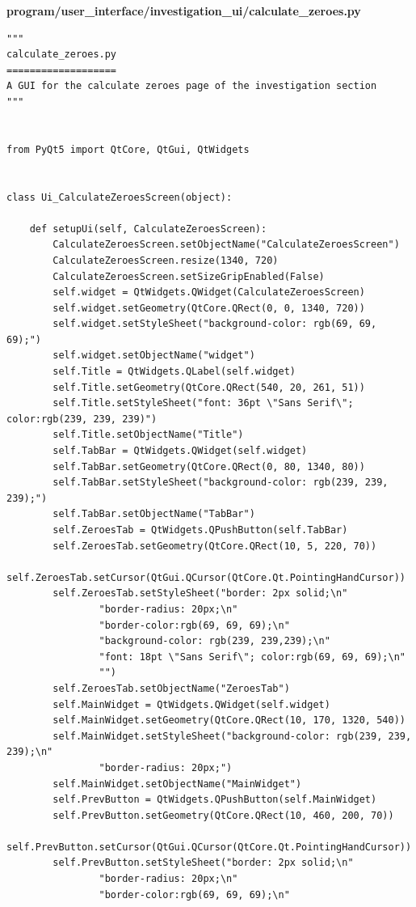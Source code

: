 \documentclass{article}
\begin{document}
\textbf{program/user\_interface/investigation\_ui/calculate\_zeroes.py}
\begin{lstlisting}
"""
calculate_zeroes.py
===================
A GUI for the calculate zeroes page of the investigation section
"""


from PyQt5 import QtCore, QtGui, QtWidgets


class Ui_CalculateZeroesScreen(object):

    def setupUi(self, CalculateZeroesScreen):
        CalculateZeroesScreen.setObjectName("CalculateZeroesScreen")
        CalculateZeroesScreen.resize(1340, 720)
        CalculateZeroesScreen.setSizeGripEnabled(False)
        self.widget = QtWidgets.QWidget(CalculateZeroesScreen)
        self.widget.setGeometry(QtCore.QRect(0, 0, 1340, 720))
        self.widget.setStyleSheet("background-color: rgb(69, 69, 69);")
        self.widget.setObjectName("widget")
        self.Title = QtWidgets.QLabel(self.widget)
        self.Title.setGeometry(QtCore.QRect(540, 20, 261, 51))
        self.Title.setStyleSheet("font: 36pt \"Sans Serif\"; color:rgb(239, 239, 239)")
        self.Title.setObjectName("Title")
        self.TabBar = QtWidgets.QWidget(self.widget)
        self.TabBar.setGeometry(QtCore.QRect(0, 80, 1340, 80))
        self.TabBar.setStyleSheet("background-color: rgb(239, 239, 239);")
        self.TabBar.setObjectName("TabBar")
        self.ZeroesTab = QtWidgets.QPushButton(self.TabBar)
        self.ZeroesTab.setGeometry(QtCore.QRect(10, 5, 220, 70))
        self.ZeroesTab.setCursor(QtGui.QCursor(QtCore.Qt.PointingHandCursor))
        self.ZeroesTab.setStyleSheet("border: 2px solid;\n"
                "border-radius: 20px;\n"
                "border-color:rgb(69, 69, 69);\n"
                "background-color: rgb(239, 239,239);\n"
                "font: 18pt \"Sans Serif\"; color:rgb(69, 69, 69);\n"
                "")
        self.ZeroesTab.setObjectName("ZeroesTab")
        self.MainWidget = QtWidgets.QWidget(self.widget)
        self.MainWidget.setGeometry(QtCore.QRect(10, 170, 1320, 540))
        self.MainWidget.setStyleSheet("background-color: rgb(239, 239, 239);\n"
                "border-radius: 20px;")
        self.MainWidget.setObjectName("MainWidget")
        self.PrevButton = QtWidgets.QPushButton(self.MainWidget)
        self.PrevButton.setGeometry(QtCore.QRect(10, 460, 200, 70))
        self.PrevButton.setCursor(QtGui.QCursor(QtCore.Qt.PointingHandCursor))
        self.PrevButton.setStyleSheet("border: 2px solid;\n"
                "border-radius: 20px;\n"
                "border-color:rgb(69, 69, 69);\n"

\end{lstlisting}
\end{document}
